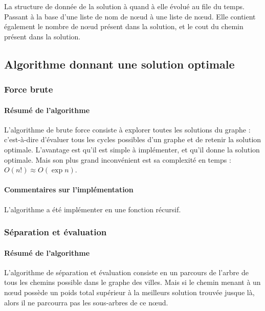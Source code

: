 \documentclass[10pt,a4paper]{report}
\begin{document}
	La structure de donnée de la solution à quand à elle évolué au file du temps.
	Passant à la base d'une liste de nom de nœud à une liste de nœud.
	Elle contient également le nombre de nœud présent dans la solution, et le cout du chemin présent dans la solution.
	
	\subsection{Algorithme donnant une solution optimale}
		\subsubsection{Force brute}
		
		\paragraph{Résumé de l'algorithme}
		\begin{flushleft}
		L'algorithme de brute force consiste à explorer toutes les solutions du graphe : c'est-à-dire d'évaluer tous les cycles possibles d'un graphe et de retenir la solution optimale.
		L'avantage est qu'il est simple à implémenter, et qu'il donne la solution optimale.
		Mais son plus grand inconvénient est sa complexité en temps :  $O(n!) \approx O(\exp n)$.
		\end{flushleft}
		\paragraph{Commentaires sur l'implémentation}
		\begin{flushleft}
		L'algorithme a été implémenter en une fonction récursif.
		\end{flushleft}
		\subsubsection{Séparation et évaluation}
		
		\paragraph{Résumé de l'algorithme}
		L'algorithme de séparation et évaluation consiste en un parcours de l'arbre de tous les chemins possible dans le graphe des villes. Mais si le chemin menant à un nœud possède un poids total supérieur à la meilleurs solution trouvée jusque là, alors il ne parcourra pas les sous-arbres de ce nœud.\\
		
\end{document}
